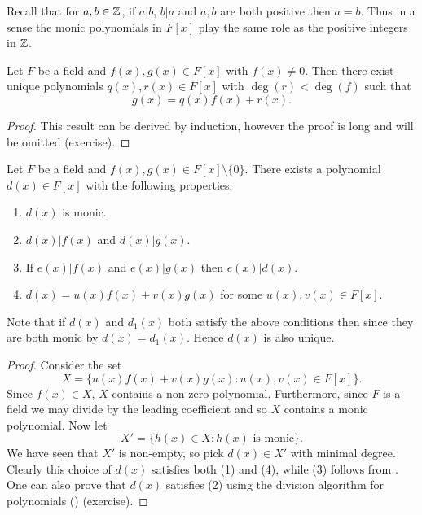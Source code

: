 \documentclass[11pt]{article}
\begin{document}
\begin{remark}
    Recall that for $a,b\in\mathbb{Z}$, if $a|b$, $b|a$ and $a,b$ are both positive then $a=b$. Thus in a sense the monic polynomials in $F[x]$ play the same role as the positive integers in $\mathbb{Z}$.
\end{remark}

\begin{proposition}
    Let $F$ be a field and $f(x),g(x)\in F[x]$ with $f(x)\neq0$. Then there exist unique polynomials $q(x),r(x)\in F[x]$ with $\deg(r)<\deg(f)$ such that
    \[g(x)=q(x)f(x)+r(x).\]
\end{proposition}

\begin{proof}
    This result can be derived by induction, however the proof is long and will be omitted (exercise).
\end{proof}

\begin{proposition}
    Let $F$ be a field and $f(x),g(x)\in F[x]\setminus\{0\}$. There exists a polynomial $d(x)\in F[x]$ with the following properties:
    \begin{enumerate}
        \item $d(x)$ is monic.
        \item $d(x)|f(x)$ and $d(x)|g(x)$.
        \item If $e(x)|f(x)$ and $e(x)|g(x)$ then $e(x)|d(x)$.
        \item $d(x)=u(x)f(x)+v(x)g(x)$ for some $u(x),v(x)\in F[x]$.
    \end{enumerate}
    Note that if $d(x)$ and $d_1(x)$ both satisfy the above conditions then since they are both monic by  $d(x)=d_1(x)$. Hence $d(x)$ is also unique.
\end{proposition}

\begin{proof}
    Consider the set
    \[X=\{u(x)f(x)+v(x)g(x):u(x),v(x)\in F[x]\}.\]
    Since $f(x)\in X$, $X$ contains a non-zero polynomial. Furthermore, since $F$ is a field we may divide by the leading coefficient and so $X$ contains a monic polynomial. Now let
    \[X'=\{h(x)\in X:h(x)\text{ is monic}\}.\]
    We have seen that $X'$ is non-empty, so pick $d(x)\in X'$ with minimal degree. Clearly this choice of $d(x)$ satisfies both (1) and (4), while (3) follows from . One can also prove that $d(x)$ satisfies (2) using the division algorithm for polynomials () (exercise).
\end{proof}
\end{document}
